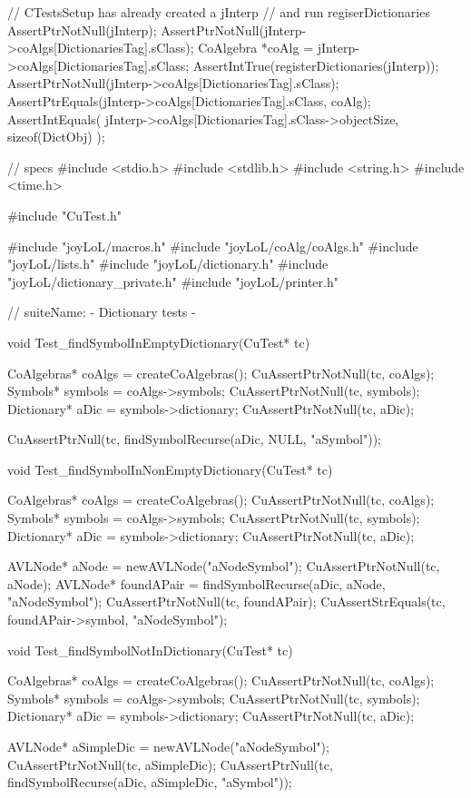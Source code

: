 
\startCTest
  // CTestsSetup has already created a jInterp
  // and run regiserDictionaries
  AssertPtrNotNull(jInterp);
  AssertPtrNotNull(jInterp->coAlgs[DictionariesTag].sClass);
  CoAlgebra *coAlg = jInterp->coAlgs[DictionariesTag].sClass;
  AssertIntTrue(registerDictionaries(jInterp));
  AssertPtrNotNull(jInterp->coAlgs[DictionariesTag].sClass);
  AssertPtrEquals(jInterp->coAlgs[DictionariesTag].sClass, coAlg);
  AssertIntEquals(
    jInterp->coAlgs[DictionariesTag].sClass->objectSize, 
    sizeof(DictObj)
  );
\stopCTest
\stopTestCase
\stopTestSuite


\starttyping
// specs
#include <stdio.h>
#include <stdlib.h>
#include <string.h>
#include <time.h>

#include "CuTest.h"

#include "joyLoL/macros.h"
#include "joyLoL/coAlg/coAlgs.h"
#include "joyLoL/lists.h"
#include "joyLoL/dictionary.h"
#include "joyLoL/dictionary_private.h"
#include "joyLoL/printer.h"

// suiteName: - Dictionary tests -

void Test_findSymbolInEmptyDictionary(CuTest* tc) {
  CoAlgebras* coAlgs = createCoAlgebras();
  CuAssertPtrNotNull(tc, coAlgs);
  Symbols* symbols = coAlgs->symbols;
  CuAssertPtrNotNull(tc, symbols);
  Dictionary* aDic = symbols->dictionary;
  CuAssertPtrNotNull(tc, aDic);

  CuAssertPtrNull(tc, findSymbolRecurse(aDic, NULL, "aSymbol"));
}

void Test_findSymbolInNonEmptyDictionary(CuTest* tc) {
  CoAlgebras* coAlgs = createCoAlgebras();
  CuAssertPtrNotNull(tc, coAlgs);
  Symbols* symbols = coAlgs->symbols;
  CuAssertPtrNotNull(tc, symbols);
  Dictionary* aDic = symbols->dictionary;
  CuAssertPtrNotNull(tc, aDic);

  AVLNode* aNode = newAVLNode("aNodeSymbol");
  CuAssertPtrNotNull(tc, aNode);
  AVLNode* foundAPair = findSymbolRecurse(aDic, aNode, "aNodeSymbol");
  CuAssertPtrNotNull(tc, foundAPair);
  CuAssertStrEquals(tc, foundAPair->symbol, "aNodeSymbol");
}

void Test_findSymbolNotInDictionary(CuTest* tc) {
  CoAlgebras* coAlgs = createCoAlgebras();
  CuAssertPtrNotNull(tc, coAlgs);
  Symbols* symbols = coAlgs->symbols;
  CuAssertPtrNotNull(tc, symbols);
  Dictionary* aDic = symbols->dictionary;
  CuAssertPtrNotNull(tc, aDic);

  AVLNode* aSimpleDic = newAVLNode("aNodeSymbol");
  CuAssertPtrNotNull(tc, aSimpleDic);
  CuAssertPtrNull(tc, findSymbolRecurse(aDic, aSimpleDic, "aSymbol"));
}

